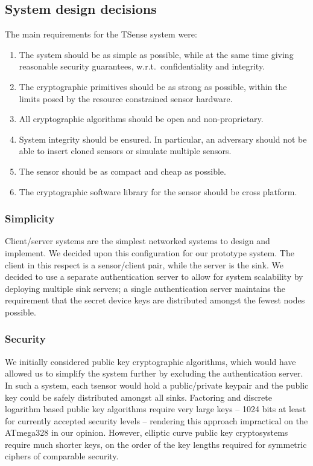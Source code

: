 \subsection{System design decisions}

The main requirements for the TSense system were:
%
\begin{enumerate}
\item The system should be as simple as possible, while at the same time giving reasonable security guarantees, w.r.t.\ confidentiality and integrity.
\item The cryptographic primitives should be as strong as possible, within the limits posed by the resource constrained sensor hardware.
\item All cryptographic algorithms should be open and non-proprietary.
\item System integrity should be ensured. In particular, an adversary should not be able to insert cloned sensors or simulate multiple sensors. 
\item The sensor should be as compact and cheap as possible.
\item The cryptographic software library for the sensor should be cross platform.
\end{enumerate}

\subsubsection{Simplicity}

Client/server systems are the simplest networked systems to design and implement. We decided upon this configuration for our prototype system. The client in this respect is a sensor/client pair, while the server is the sink. We decided to use a separate authentication server to allow for system scalability by deploying multiple sink servers; a single authentication server maintains the requirement that the secret device keys are distributed amongst the fewest nodes possible.

\subsubsection{Security}

We initially considered public key cryptographic algorithms, which would have allowed us to simplify the system further by excluding the authentication server. In such a system, each tsensor would hold a public/private keypair and the public key could be safely distributed amongst all sinks. Factoring and discrete logarithm based public key algorithms require very large keys -- 1024 bits at least for currently accepted security levels -- rendering this approach impractical on the ATmega328 in our opinion. 
%
However, elliptic curve public key cryptosystems  require much shorter keys, on the order of the key lengths required for symmetric ciphers of comparable security.

